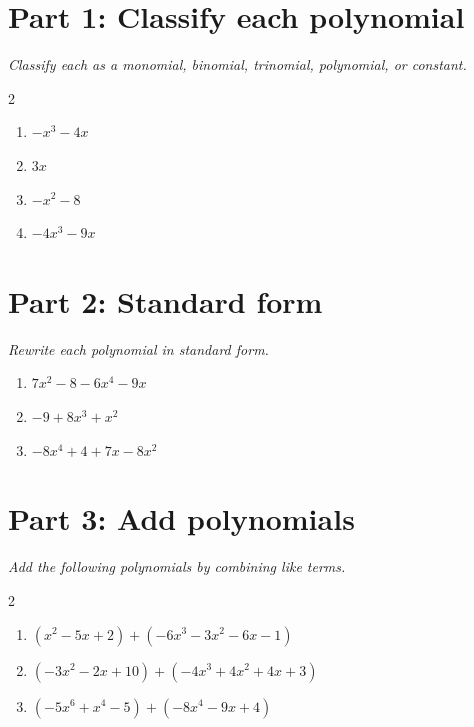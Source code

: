 \documentclass[11pt]{article}
\begin{document}
\section*{Part 1: Classify each polynomial}
\noindent\textit{Classify each as a monomial, binomial, trinomial, polynomial, or constant.}
\begin{multicols}{2}
\begin{enumerate}
  \item $-x^{3} - 4x$
  \vspace{0.4cm}
  \item $3x$
  \vspace{0.4cm}
  \item $-x^{2} - 8$
  \vspace{0.4cm}
  \item $-4x^{3} - 9x$
  \vspace{0.4cm}
\end{enumerate}
\end{multicols}

\section*{Part 2: Standard form}
\noindent\textit{Rewrite each polynomial in standard form.}
\begin{enumerate}
  \item $7x^{2} - 8 - 6x^{4} - 9x$
  \vspace{1.3cm}
  \item $-9 + 8x^{3} + x^{2}$
  \vspace{1.3cm}
  \item $-8x^{4} + 4 + 7x - 8x^{2}$
  \vspace{1.3cm}
\end{enumerate}

\section*{Part 3: Add polynomials}
\noindent\textit{Add the following polynomials by combining like terms.}
\begin{multicols}{2}
\begin{enumerate}
  \item $(x^{2} - 5x + 2) + (-6x^{3} - 3x^{2} - 6x - 1)$
  \vspace{1.8cm}
  \item $(-3x^{2} - 2x + 10) + (-4x^{3} + 4x^{2} + 4x + 3)$
  \vspace{1.8cm}
  \item $(-5x^{6} + x^{4} - 5) + (-8x^{4} - 9x + 4)$
  \vspace{1.8cm}
\end{enumerate}
\end{multicols}
\end{document}
